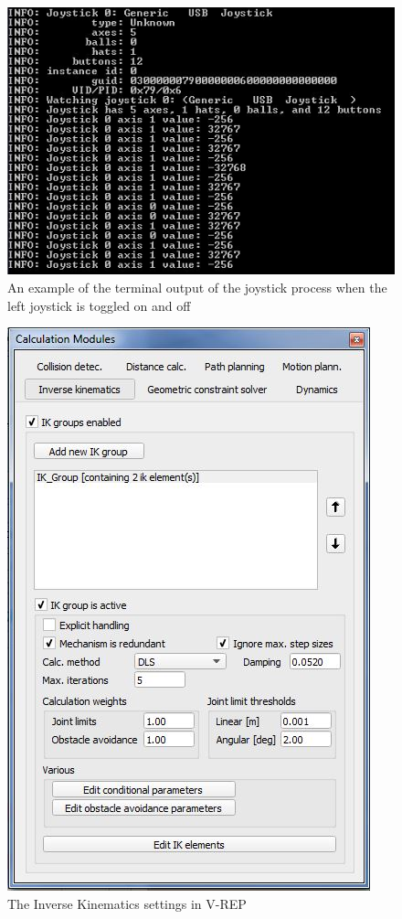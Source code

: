 \documentclass[12pt,openany,a4paper]{book}
\begin{document}
\vspace{\baselineskip}

\begin{center}
\begin{figure}[htb]
  \includegraphics[width=0.9\linewidth]{joystick_cmdline.jpg}
\caption{An example of the terminal output of the joystick process when the left joystick is toggled on and off}
\end{figure}
\end{center}


\begin{center}
\begin{figure}[htb]
  \includegraphics[width=0.5\linewidth]{VREP_ik_dialog.jpg}
\caption{The Inverse Kinematics settings in V-REP}
\end{figure}
\end{center}
\end{document}
